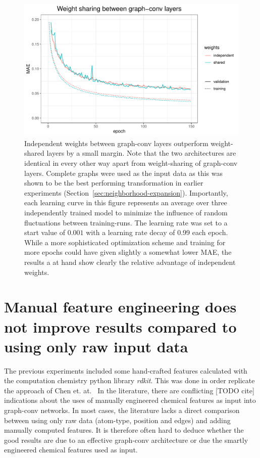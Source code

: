 \begin{figure}[H]
	\includegraphics[width=\linewidth]{figures/weight-sharing.pdf}
	
	\caption{Independent weights between graph-conv layers outperform weight-shared layers by a small margin. Note that the two architectures are identical in every other way apart from weight-sharing of graph-conv layers. Complete graphs were used as the input data as this was shown to be the best performing transformation in earlier experiments (Section~\ref{sec:neighborhood-expansion}). Importantly, each learning curve in this figure represents an average over three independently trained model to minimize the influence of random fluctuations between training-runs. The learning rate was set to a start value of $0.001$ with a learning rate decay of 0.99 each epoch. While a more sophisticated optimization scheme and training for more epochs could have given slightly a somewhat lower MAE, the results a at hand show clearly the relative advantage of independent weights.}
	\label{fig:weight-sharing}
\end{figure}


\section{Manual feature engineering does not improve results compared to using only raw input data}

The previous experiments included some hand-crafted features calculated with the computation chemistry python library \textit{rdkit}. This was done in order replicate the approach of Chen et. at.~\cite{Chen2019} In the literature, there are conflicting [TODO cite] indications about the uses of manually engineered chemical features as input into graph-conv networks. In most cases, the literature lacks a direct comparison between using only raw data (atom-type, position and edges) and adding manually computed features. It is therefore often hard to deduce whether the good results are due to an effective graph-conv architecture or due the smartly engineered chemical features used as input.

